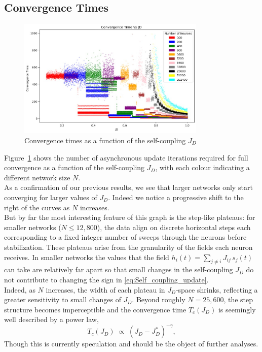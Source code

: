 \documentclass[a4paper,12pt]{report}
\begin{document}
\subsection*{Convergence Times}

\begin{figure}[h!]
  \centering
  \includegraphics[width=0.8\textwidth]{pictures/Average_conv_time.jpg}
  \caption{Convergence times as a function of the self-coupling $J_D$}
  \label{fig:average_convergence_time_vs_JD}
\end{figure}

Figure~\ref{fig:average_convergence_time_vs_JD} shows the number of asynchronous update iterations required 
for full convergence as a function of the self-coupling \(J_D\), with each colour 
indicating a different network size \(N\). \\
As a confirmation of our previous results, we see that larger networks only start 
converging for larger values of \(J_D\). Indeed we notice a progressive shift to the 
right of the curves as \(N\) increases. \\
But by far the most interesting feature of this graph is the step-like plateaus: 
for smaller networks (\(N\leq 12{,}800\)), the data align on discrete horizontal 
steps each corresponding to a fixed integer number of sweeps through the neurons 
before stabilization. These plateaus arise from the granularity of the fields each 
neuron receives. In smaller networks the values that the field 
$h_i(t) = \sum_{j\neq i} J_{ij}\,s_j(t)$ can take are relatively far apart so that small 
changes in the self-coupling $J_D$ do not contribute to changing the sign in 
\ref{eq:Self_coupling_update}. \\
Indeed, as \(N\) increases, the width of each plateau in \(J_D\)-space shrinks, 
reflecting a greater sensitivity to small changes of $J_D$. Beyond roughly 
\(N=25{,}600\), the step structure becomes imperceptible and the convergence time 
\(T_c(J_D)\) is seemingly well described by a power law,
\[
  T_c(J_D)\;\propto\;(J_D - J_D^*)^{-\gamma},
\]
Though this is currently speculation and should be the object of further analyses.
\end{document}
